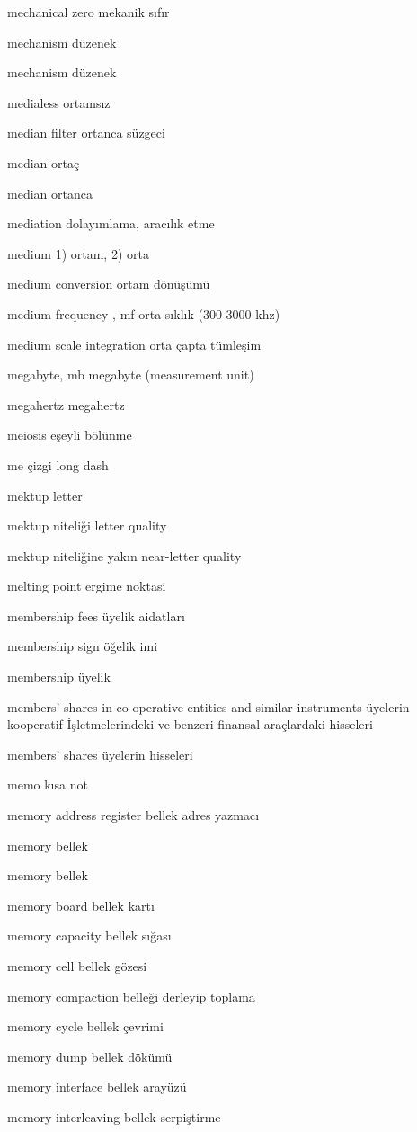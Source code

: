 \documentclass[12pt,fleqn]{article}\usepackage{../../common}
\begin{document}
mechanical zero mekanik sıfır

mechanism düzenek

mechanism düzenek

medialess ortamsız

median filter ortanca süzgeci

median ortaç

median ortanca

mediation dolayımlama, aracılık etme

medium 1) ortam, 2) orta

medium conversion ortam dönüşümü

medium frequency , mf orta sıklık (300-3000 khz)

medium scale integration orta çapta tümleşim

megabyte, mb megabyte (measurement unit)

megahertz megahertz

meiosis eşeyli bölünme

me çizgi long dash

mektup letter

mektup niteliği letter quality

mektup niteliğine yakın near-letter quality

melting point ergime noktasi

membership fees üyelik aidatları

membership sign öğelik imi

membership üyelik

members' shares in co-operative entities and similar instruments üyelerin kooperatif İşletmelerindeki ve benzeri finansal araçlardaki hisseleri

members' shares üyelerin hisseleri

memo kısa not

memory address register bellek adres yazmacı

memory bellek

memory bellek

memory board bellek kartı

memory capacity bellek sığası

memory cell bellek gözesi

memory compaction belleği derleyip toplama

memory cycle bellek çevrimi

memory dump bellek dökümü

memory interface bellek arayüzü

memory interleaving bellek serpiştirme
\end{document}
